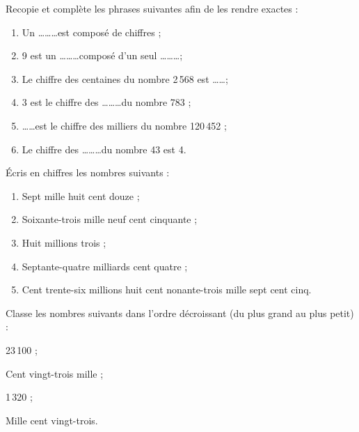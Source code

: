 


\begin{exercice}
Recopie et complète les phrases suivantes afin de les rendre exactes :
\begin{enumerate}
 \item Un \ldots \ldots \ldots est composé de chiffres ;
 \item 9 est un \ldots \ldots \ldots composé d'un seul \ldots \ldots \ldots ;
 \item Le chiffre des centaines du nombre 2\,568 est \ldots \ldots ;
 \item 3 est le chiffre des \ldots \ldots \ldots du nombre 783 ;
 \item \ldots \ldots est le chiffre des milliers du nombre 120\,452 ;
 \item Le chiffre des \ldots \ldots \ldots du nombre 43 est 4.
\end{enumerate}
\end{exercice}

\begin{exercice}
Écris en chiffres les nombres suivants :
\begin{enumerate}
 \item Sept mille huit cent douze ;
 \item Soixante-trois mille neuf cent cinquante ;
 \item Huit millions trois ;
 \item Septante-quatre milliards cent quatre ;
 \item Cent trente-six millions huit cent nonante-trois mille sept cent cinq.
 \end{enumerate}
\end{exercice}

\begin{exercice}
Classe les nombres suivants dans l'ordre décroissant (du plus grand au plus petit) :
\begin{colitemize}{2}
 \item 23\,100 ;
 \item Cent vingt-trois mille ;
 \item 1\,320 ;
 \item Mille cent vingt-trois.
 \end{colitemize}
\end{exercice}


